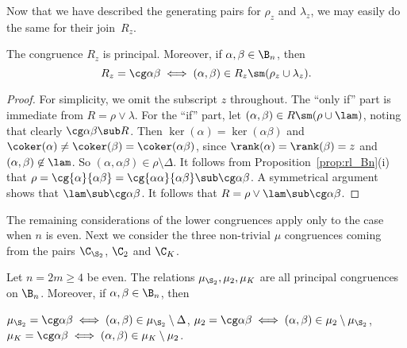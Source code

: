 


Now that we have described the generating pairs for $\rho_z$ and $\lambda_z$, we may easily do the same for their join~$R_z$.


\begin{proposition}\label{prop:R01_Bn}
The congruence $R_z$ is principal.  Moreover, if $\alpha,\beta\in\B_n$, then
\[
R_z=\cg\alpha\beta\iff(\alpha,\beta)\in R_z\sm(\rho_z\cup\lambda_z).
\]
\end{proposition}

\begin{proof}
For simplicity, we omit the subscript $z$ throughout.
The ``only if'' part is immediate from $R=\rho\vee\lambda$.
For the ``if'' part, let  $(\alpha,\beta)\in R\sm(\rho\cup\lam)$, noting that clearly $\cg\alpha\beta\sub R$.
%
Then $\ker(\alpha)=\ker(\alpha\beta)$ and $\coker(\alpha)\not=\coker(\beta)=\coker(\alpha\beta)$, since $\rank(\alpha)=\rank(\beta)=z$ and $(\alpha,\beta)\not\in \lam$.  So $(\alpha,\alpha\beta)\in\rho\setminus\Delta$.  It follows from Proposition~\ref{prop:rl_Bn}(i) that $\rho=\cg{\alpha}{\alpha\beta}=\cg{\alpha\alpha}{\alpha\beta}\sub\cg\alpha\beta$.  A symmetrical argument shows that $\lam\sub\cg\alpha\beta$.  It follows that $R=\rho\vee\lam\sub\cg\alpha\beta$. \end{proof}


The remaining considerations of the lower congruences apply only to the case when $n$ is even.  Next we consider the three non-trivial $\mu$ congruences coming from the pairs $\C_{\S_2}$, $\C_2$ and $\C_K$.


\newpage

\begin{proposition}\label{prop:nek}
Let $n=2m\geq4$ be even.  The relations $\mu_{\S_2},\mu_2,\mu_K$ are all principal congruences on $\B_n$.  Moreover, if $\alpha,\beta\in\B_n$, then
\begin{itemize}\begin{multicols}{2}
 $\mu_{\S_2}=\cg\alpha\beta\iff (\alpha,\beta)\in\mu_{\S_2}\setminus\Delta$,
 $\mu_2=\cg\alpha\beta\iff (\alpha,\beta)\in\mu_2\setminus\mu_{\S_2}$,
 $\mu_K=\cg\alpha\beta\iff (\alpha,\beta)\in\mu_K\setminus\mu_2$.
\end{multicols}\end{itemize}
\end{proposition}


